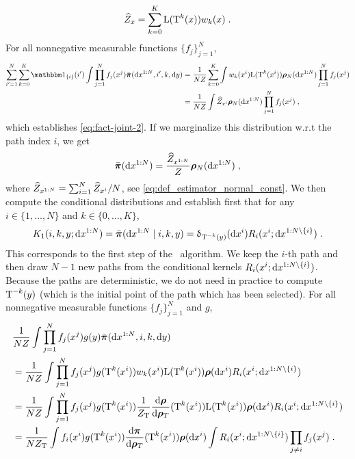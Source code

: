 \begin{equation}
\label{eq:new-estconst}
 \widehat{Z}_{x}=\sum_{k=0}^K\mathrm{L}(\operatorname{T}^{k}(x)) w_k(x) \;.
\end{equation}
For all nonnegative measurable functions $\{f_j\}_{j=1}^N$,
\begin{align*}
\sum_{i'=1}^N \sum_{k=0}^K \indiacc{i}(i') \int \prod_{j=1}^N f_j(x^j) \bmeaspi(\rmd \chunku{x}{1}{N},i',k,\rmd y)
&= \frac{1}{N \const} \sum_{k=0}^K \int \w_k(x^i) \likelihood(\transfo^k(x^i)) \measprop_N(\rmd \chunku{x}{1}{N}) \prod_{j=1}^N f_j(x^j) \\
&= \frac{1}{N \const} \int \estConstC{x^i} \measprop_N(\rmd \chunku{x}{1}{N}) \prod_{j=1}^N f_j(x^j)\eqsp,
\end{align*}
which establishes \eqref{eq:fact-joint-2}. If we marginalize this distribution w.r.t the path index $i$, we get
\begin{equation}
\label{eq:fact-joint-2-cor}
\bar{\boldsymbol{\pi}}(\mathrm{d} x^{1:N})=  \frac{\widehat{Z}_{x^{1:N}}}{Z}  \boldsymbol{\rho}_N(\mathrm{d} x^{1:N}) \;,
\end{equation}
where $\widehat{Z}_{x^{1:N}} = \sum_{i=1}^N\widehat{Z}_{x^i}/N$, see \eqref{eq:def_estimator_normal_const}. We then compute the conditional distributions and establish first that for any $i \in \{1,\dots,N\}$ and $k \in \{0,\dots,K\}$,
\begin{equation}
\label{eq:key-relation-1}
K_1(i,k,y; \mathrm{d} x^{1:N})  = \bar{\boldsymbol{\pi}}(\mathrm{d} x^{1:N} \mid i,k,y)= \updelta_{\operatorname{T}^{-k}(y)}(\mathrm{d} x^i) R_i(x^i; \mathrm{d} x^{1:N \setminus \{i\}}) \;.
\end{equation}
This corresponds to the first step of the \IFIS\ algorithm. We keep the $i$-th path and then draw $N-1$ new paths from the conditional kernels $R_i(x^i;\mathrm{d} x^{1:N \setminus \{i\}})$. Because the paths are deterministic, we do not need in practice to compute $\operatorname{T}^{-k}(y)$ (which is the initial point of the path which has been selected).
For all nonnegative measurable functions $\{f_j\}_{j=1}^N$ and $g$,
\begin{align*}
& \frac{1}{N Z} \int \prod_{j=1}^N f_j(x^j) g(y) \bar{\boldsymbol{\pi}}(\mathrm{d} x^{1:N},i,k,\mathrm{d} y) \\
& = \frac{1}{N Z} \int \prod_{j=1}^N f_j(x^j) g(\operatorname{T}^k(x^i))w_k(x^i) \mathrm{L}(\operatorname{T}^k(x^i)) \boldsymbol{\rho}(\mathrm{d} x^i) R_i(x^i; \mathrm{d} x^{1:N \setminus \{i\}}) \\
&= \frac{1}{N Z} \int \prod_{j=1}^N f_j(x^j) g(\operatorname{T}^k(x^i))\frac{1}{Z_{\operatorname{T}}} \frac{\mathrm{d} \boldsymbol{\rho}}{\mathrm{d} \boldsymbol{\rho}_T}(\operatorname{T}^k(x^i))  \mathrm{L}(\operatorname{T}^k(x^i)) \boldsymbol{\rho}(\mathrm{d} x^i) R_i(x^i; \mathrm{d} x^{1:N \setminus \{i\}}) \\
&= \frac{1}{N Z_{\operatorname{T}}} \int f_i(x^i) g(\operatorname{T}^k(x^i)) \frac{\mathrm{d} \boldsymbol{\pi}}{\mathrm{d} \boldsymbol{\rho}_T}(\operatorname{T}^k(x^i)) \boldsymbol{\rho}(\mathrm{d} x^i) \int R_i(x^i; \mathrm{d} x^{1:N \setminus \{i\}}) \prod_{j \neq i} f_j(x^j) \;.
\end{align*}
